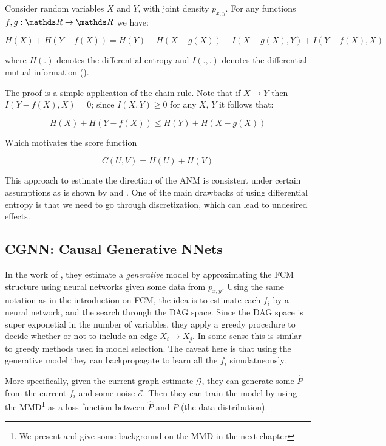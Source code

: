 \begin{lemma} Consider random variables $X$ and $Y$, with joint density $p_{x, y}$. For any functions 
$f, g : \R \rightarrow \R$ we have:

$$
    H(X) + H(Y - f(X)) = H(Y) + H(X - g(X)) - I(X - g(X), Y) + I(Y - f(X), X)
$$

where $H(.)$ denotes the differential entropy and $I(.,.)$ denotes the differential mutual information 
(\cite{cover1999elements}).
\end{lemma}

The proof is a simple application of the chain rule. Note that if $X \rightarrow Y$ then $I(Y - f(X), X) = 0$; 
since $I(X, Y) \geq 0$ for any $X$, $Y$ it follows
that:

$$
    H(X) + H(Y - f(X)) \leq  H(Y) + H(X - g(X))
$$

Which motivates the score function

$$
    C(U, V) = H(U) + H(V)
$$

This approach to estimate the direction of the ANM is consistent under certain assumptions as is shown by 
\cite{kpotufe2014consistency} and \cite{nowzohour2016score}. One of the main drawbacks of using differential
entropy is that we need to go through discretization, which can lead to undesired effects.

\subsection{CGNN: Causal Generative NNets}

In the work of \cite{goudet2017causal}, they estimate a \textit{generative} model by approximating
the FCM structure using neural networks given some data from $p_{x, y}$. Using the same notation
as in the introduction on FCM, the idea is to estimate each $f_i$ by a neural network, and the 
search through the DAG space. Since the DAG space is super exponetial in the number of variables,
they apply a greedy procedure to decide whether or not to include an edge $X_i \rightarrow X_j$.
In some sense this is similar to greedy methods used in model selection. The caveat here is that
using the generative model they can backpropagate to learn all the $f_i$ simulatneously. 

More specifically, given the current graph estimate $\mathcal{G}$, they can generate some $\hat{P}$
from the current $f_i$ and some noise $\mathcal{E}$. Then they can train the model by using 
the MMD\footnote{We present and give some background on the MMD in the next chapter} 
as a loss function between $\hat{P}$ and $P$ (the data distribution).

